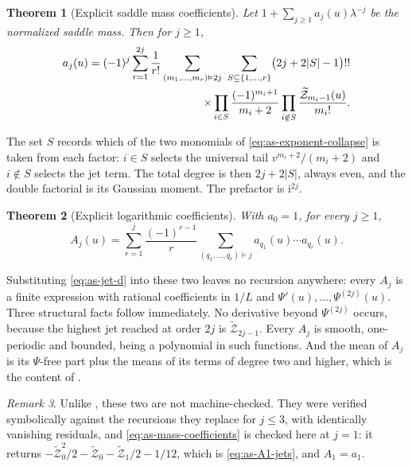 \documentclass[11pt,oneside]{article}
\newtheorem{theorem}{Theorem}[section]
\theoremstyle{definition}
\theoremstyle{remark}
\newtheorem{remark}[theorem]{Remark}
\newcommand{\ii}{\mathrm i}
\begin{document}
\begin{theorem}[Explicit saddle mass coefficients]
\label{thm:as-mass-coefficients}
Let $1+\sum_{j\ge1}a_j(u)\lambda^{-j}$ be the normalized saddle mass.  Then for $j\ge1$,
\begin{align}
 a_j(u)=(-1)^{j}\sum_{r=1}^{2j}\frac1{r!}
   \sum_{(m_1,\ldots,m_r)\vDash 2j}\ \sum_{S\subseteq\{1,\ldots,r\}}
   \bigl(2j+2|S|-1\bigr)!!                                 \notag\\
   \times\prod_{i\in S}\frac{(-1)^{m_i+1}}{m_i+2}
   \prod_{i\notin S}\frac{\widetilde{\mathcal Z}_{m_i-1}(u)}{m_i!}.
                                                          \label{eq:as-mass-coefficients}
\end{align}
\end{theorem}

The set $S$ records which of the two monomials of \eqref{eq:as-exponent-collapse} is taken
from each factor: $i\in S$ selects the universal tail $v^{m_i+2}/(m_i+2)$ and $i\notin S$
selects the jet term.  The total degree is then $2j+2|S|$, always even, and the double
factorial is its Gaussian moment.  The prefactor is $\ii^{2j}$.

\begin{theorem}[Explicit logarithmic coefficients]
\label{thm:as-log-coefficients}
With $a_0=1$, for every $j\ge1$,
\begin{equation}
 A_j(u)=\sum_{r=1}^{j}\frac{(-1)^{r-1}}{r}
   \sum_{(q_1,\ldots,q_r)\vDash j}a_{q_1}(u)\cdots a_{q_r}(u).
                                                          \label{eq:as-log-coefficients}
\end{equation}
\end{theorem}

Substituting \eqref{eq:as-jet-d} into these two leaves no recursion anywhere: every $A_j$ is
a finite expression with rational coefficients in $1/L$ and $\Psi'(u),\ldots,\Psi^{(2j)}(u)$.
Three structural facts follow immediately.  No derivative beyond $\Psi^{(2j)}$ occurs,
because the highest jet reached at order $2j$ is $\widetilde{\mathcal Z}_{2j-1}$.  Every
$A_j$ is smooth, one-periodic and bounded, being a polynomial in such functions.  And the
mean of $A_j$ is its $\Psi$-free part plus the means of its terms of degree two and higher,
which is the content of .

\begin{remark}
Unlike , these two are not machine-checked.  They were verified
symbolically against the recursions they replace for $j\le3$, with identically vanishing
residuals, and \eqref{eq:as-mass-coefficients} is checked here at $j=1$: it returns
$-\widetilde{\mathcal Z}_0^{2}/2-\widetilde{\mathcal Z}_0-\widetilde{\mathcal Z}_1/2-1/12$,
which is \eqref{eq:as-A1-jets}, and $A_1=a_1$.
\end{remark}
\end{document}
